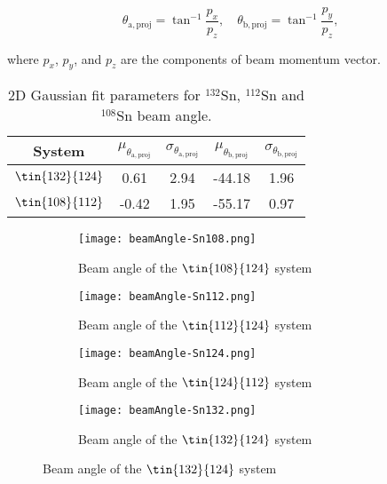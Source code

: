 
\begin{equation}
  \theta_\mathrm{a,proj}=\tan^{-1}\frac{p_x}{p_z},\quad
  \theta_\mathrm{b,proj}=\tan^{-1}\frac{p_y}{p_z},
  \label{beamAngle}
\end{equation}

where $p_x$, $p_y$, and $p_z$ are the components of beam momentum vector.



\begin{table}[!htb]
  \begin{center}
    \begin{tabular}{ccccc}
      \hline 
      System & $\mu_{\theta_\mathrm{a,proj}}$ &
      $\sigma_{\theta_\mathrm{a,proj}}$ & $\mu_{\theta_\mathrm{b,proj}}$ &
      $\sigma_{\theta_\mathrm{b,proj}}$ \\
      \hline\hline 
      $\tin{132}{124}$ & 0.61 & 2.94 & -44.18 & 1.96 \\
      $\tin{108}{112}$ & -0.42 & 1.95 & -55.17 & 0.97 \\
      \hline
    \end{tabular}
    \caption{2D Gaussian fit parameters for $^{132}$Sn, $^{112}$Sn and
      $^{108}$Sn beam angle. \label{beamAngleParameters}}
  \end{center}
\end{table}

\begin{figure}[!htb]
    \centering
    \begin{subfigure}[t]{0.45\textwidth}
        \centering
        \texttt{[image: beamAngle-Sn108.png]} 
        \caption{Beam angle of the $\tin{108}{124}$ system} \label{fig:beamangle108}
    \end{subfigure}
    \hfill
    \begin{subfigure}[t]{0.45\textwidth}
        \centering
        \texttt{[image: beamAngle-Sn112.png]} 
        \caption{Beam angle of the $\tin{112}{124}$ system} \label{fig:beamangle112}
    \end{subfigure}
    
    \begin{subfigure}[t]{0.45\textwidth}
        \centering
        \texttt{[image: beamAngle-Sn124.png]} 
        \caption{Beam angle of the $\tin{124}{112}$ system} \label{fig:beamangle124}
    \end{subfigure}
    \hfill
    \begin{subfigure}[t]{0.45\textwidth}
        \centering
        \texttt{[image: beamAngle-Sn132.png]} 
        \caption{Beam angle of the $\tin{132}{124}$ system} \label{fig:beamangle132}
    \end{subfigure}
\label{fig:beamangle}
\end{figure}


